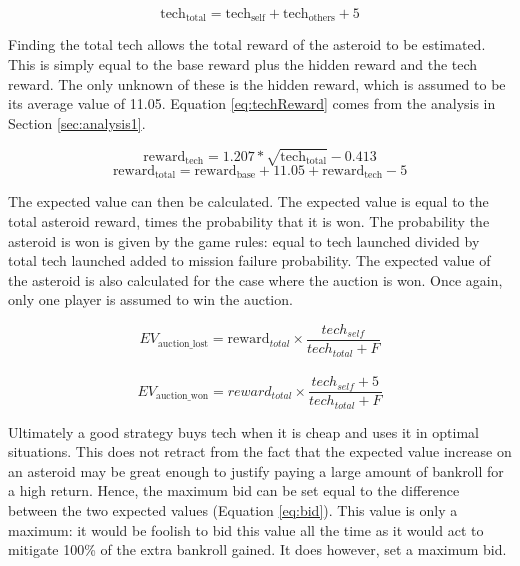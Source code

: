 \documentclass[11pt, twoside]{article}
\begin{document}
\begin{equation}
	\label{eq:techReward}
	\text{tech}_{\text{total}} = \text{tech}_{\text{self}} + \text{tech}_{\text{others}} + 5
\end{equation}

Finding the total tech allows the total reward of the asteroid to be estimated. This is simply equal to the base reward plus the hidden reward and the tech reward. The only unknown of these is the hidden reward, which is assumed to be its average value of 11.05. Equation \ref{eq:techReward} comes from the analysis in Section \ref{sec:analysis1}.

\begin{equation}
	\text{reward}_{\text{tech}} = 1.207 * \sqrt{\text{tech}_{\text{total}}} - 0.413
	\label{eq:reward}
\end{equation}
\begin{equation}
	\text{reward}_{\text{total}} = \text{reward}_{\text{base}} + 11.05 + \text{reward}_{\text{tech}} - 5 \nonumber 
\end{equation}

The expected value can then be calculated. The expected value is equal to the total asteroid reward, times the probability that it is won. The probability the asteroid is won is given by the game rules: equal to tech launched divided by total tech launched added to mission failure probability. The expected value of the asteroid is also calculated for the case where the auction is won. Once again, only one player is assumed to win the auction.

\begin{equation}
	EV_{\text{auction\_lost}} = \text{reward}_{total} \times \dfrac{tech_{self}}{tech_{total}+F}
	\label{eq:EV1}
\end{equation}\\
\begin{equation}
	EV_{\text{auction\_won}} = reward_{total} \times \dfrac{tech_{self} + 5}{tech_{total}+F} \nonumber
\end{equation}

Ultimately a good strategy buys tech when it is cheap and uses it in optimal situations. This does not retract from the fact that the expected value increase on an asteroid may be great enough to justify paying a large amount of bankroll for a high return. Hence, the maximum bid can be set equal to the difference between the two expected values (Equation \ref{eq:bid}). This value is only a maximum: it would be foolish to bid this value all the time as it would act to mitigate 100\% of the extra bankroll gained. It does however, set a maximum bid.
\end{document}
